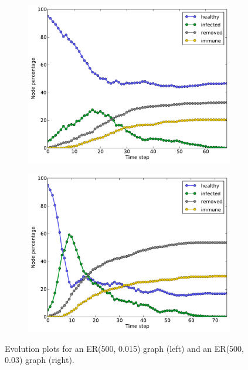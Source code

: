 \documentclass[11pt]{article} %
\begin{document}
\begin{figure}[tb]
  \begin{subfigure}[b]{0.5\textwidth}
    \centering
    \includegraphics[width=\textwidth]{figures/evo_ER_500_0015}
  \end{subfigure}
  \begin{subfigure}[b]{0.5\textwidth}
    \centering
    \includegraphics[width=\textwidth]{figures/evo_ER_500_003}
  \end{subfigure}
  \caption{Evolution plots for an ER(500, 0.015) graph (left) and an
    ER(500, 0.03) graph (right).}
  \label{fig:er_evo}
\end{figure}
\end{document}

